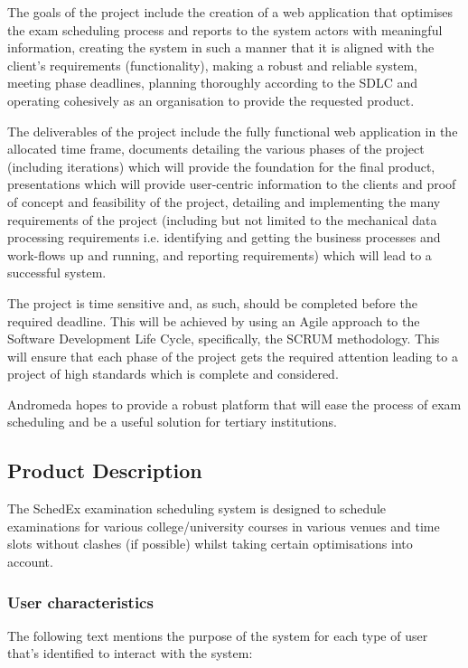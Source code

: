 \documentclass{article}
\begin{document}
The goals of the project include the creation of a web application that optimises the exam scheduling process and reports to the system actors with meaningful information, creating the system in such a manner that it is aligned with the client's requirements (functionality), making a robust and reliable system, meeting phase deadlines, planning thoroughly according to the SDLC and operating cohesively as an organisation to provide the requested product.

The deliverables of the project include the fully functional web application in the allocated time frame, documents detailing the various phases of the project (including iterations) which will provide the foundation for the final product, presentations which will provide user-centric information to the clients and proof of concept and feasibility of the project, detailing and implementing the many requirements of the project (including but not limited to the mechanical data processing requirements i.e. identifying and getting the business processes and work-flows up and running, and reporting requirements) which will lead to a successful system.

The project is time sensitive and, as such, should be completed before the required deadline. This will be achieved by using an Agile approach to the Software Development Life Cycle, specifically, the SCRUM methodology. This will ensure that each phase of the project gets the required attention leading to a project of high standards which is complete and considered.

Andromeda hopes to provide a robust platform that will ease the process of exam scheduling and be a useful solution for tertiary institutions.

\subsection{Product Description}

The SchedEx examination scheduling system is designed to schedule examinations for various college/university courses in various venues and time slots without clashes (if possible) whilst taking certain optimisations into account.

\subsubsection{User characteristics}

The following text mentions the purpose of the system for each type of user that's identified to interact with the system:
\end{document}
